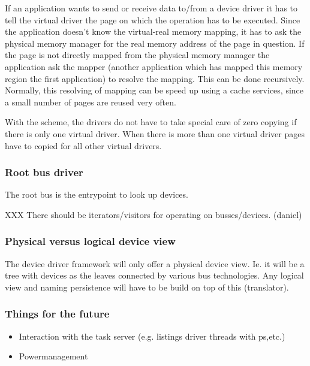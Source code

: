 \documentclass[9pt,a4paper]{extarticle}
\begin{document}
  If an application wants to send or receive data to/from a device
  driver it has to tell the virtual driver the page on which the
  operation has to be executed.  Since the application doesn't know
  the virtual-real memory mapping, it has to ask the physical memory
  manager for the real memory address of the page in question.  If the
  page is not directly mapped from the physical memory manager the
  application ask the mapper (another application which has mapped
  this memory region the first application) to resolve the mapping.
  This can be done recursively.  Normally, this resolving of mapping
  can be speed up using a cache services, since a small number of
  pages are reused very often.
  
  With the scheme, the drivers do not have to take special care of
  zero copying if there is only one virtual driver.  When there is
  more than one virtual driver pages have to copied for all other
  virtual drivers.

\subsubsection{Root bus driver}
  
  The root bus is the entrypoint to look up devices.
  
  XXX There should be iterators/visitors for operating on
  busses/devices.  (daniel)

\subsubsection{Physical versus logical device view}
  
  The device driver framework will only offer a physical device view.
  Ie. it will be a tree with devices as the leaves connected by
  various bus technologies.  Any logical view and naming persistence
  will have to be build on top of this (translator).

\subsubsection{Things for the future}

  \begin{itemize}
  \item Interaction with the task server (e.g. listings driver threads 
    with ps,etc.)
  \item Powermanagement
  \end{itemize}
\end{document}
